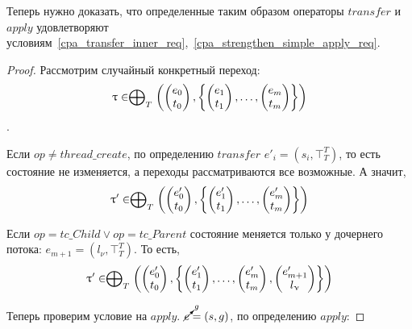 Теперь нужно доказать, что определенные таким образом операторы $transfer$ и $apply$ удовлетворяют условиям~\ref{cpa_transfer_inner_req},~\ref{cpa_strengthen_simple_apply_req}.

\begin{proof}
Рассмотрим случайный конкретный переход:
$$\uptau \in  \mathrel{\bigoplus}_{T}
\left(
\begin{pmatrix}
e_0 \\
t_0 
\end{pmatrix},
\left\{
\begin{pmatrix}
e_1 \\
t_1 
\end{pmatrix},
\dots ,
\begin{pmatrix}
e_m \\
t_m 
\end{pmatrix}
\right\}
\right)$$.

Если $op \neq thread\_create$, по определению $transfer$ $e'_i = (s_i, \top^T_T)$, то есть состояние не изменяется, а переходы рассматриваются все возможные. 
А значит, 
$$\uptau' \in  \mathrel{\bigoplus}_{T}
\left(
\begin{pmatrix}
e'_0 \\
t_0 
\end{pmatrix},
\left\{
\begin{pmatrix}
e'_1 \\
t_1 
\end{pmatrix},
\dots ,
\begin{pmatrix}
e'_m \\
t_m 
\end{pmatrix}
\right\}
\right)$$

Если $op = tc\_{Child} \lor op = tc\_{Parent}$ состояние меняется только у дочернего потока: $e_{m+1} = (l_{\nu}, \top^T_T)$.
То есть, 
$$\uptau' \in  \mathrel{\bigoplus}_{T}
\left(
\begin{pmatrix}
e'_0 \\
t_0 
\end{pmatrix},
\left\{
\begin{pmatrix}
e'_1 \\
t_1 
\end{pmatrix},
\dots ,
\begin{pmatrix}
e'_m \\
t_m 
\end{pmatrix} ,
\begin{pmatrix}
e'_{m+1} \\
l_{\upnu} 
\end{pmatrix}
\right\}
\right)$$

Теперь проверим условие на $apply$. 
$\cancelto{g}{e} = (s, g)$, по определению $apply$: 

\end{proof}
